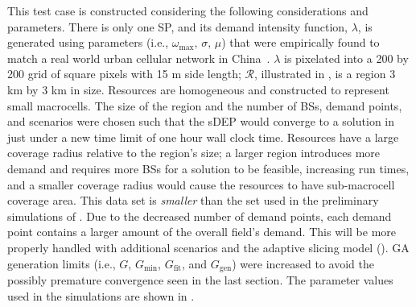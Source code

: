 \documentclass[12pt,dvipsnames]{report}
\begin{document}
This test case is constructed considering the following considerations and parameters.  There is only one SP, and its demand intensity function, $\lambda$, is generated using parameters (i.e., $\omega_{\max},\, \sigma,\, \mu$) that were empirically found to match a real world urban cellular network in China~\cite{6757900}.  $\lambda$ is pixelated into a 200 by 200 grid of square pixels with 15 m side length; $\mathcal{R}$, illustrated in , is a region 3 km by 3 km in size.  Resources are homogeneous and constructed to represent small macrocells.  The size of the region and the number of BSs, demand points, and scenarios were chosen such that the sDEP would converge to a solution in just under a new time limit of one hour wall clock time.  Resources have a large coverage radius relative to the region's size; a larger region introduces more demand and requires more BSs for a solution to be feasible, increasing run times, and a smaller coverage radius would cause the resources to have sub-macrocell coverage area.  This data set is \emph{smaller} than the set used in the preliminary simulations of .  Due to the decreased number of demand points, each demand point contains a larger amount of the overall field's demand.  This will be more properly handled with additional scenarios and the adaptive slicing model ().  GA generation limits (i.e., $G$, $G_{\min}$, $G_{\text{fit}}$, and $G_{\text{gen}}$) were increased to avoid the possibly premature convergence seen in the last section.  The parameter values used in the simulations are shown in .
\end{document}
